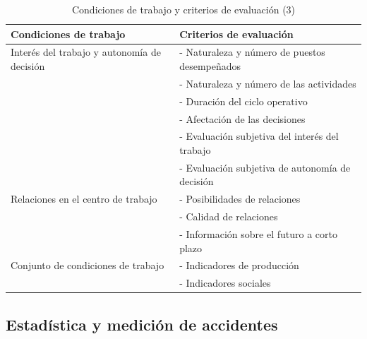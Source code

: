 \documentclass{article} %
\begin{document}
    \begin{table}[h!]
    \centering
    \begin{tabular}{|l|l|}
    \hline
    \textbf{Condiciones de trabajo}          & \textbf{Criterios de evaluación}                                  \\ \hline
    Interés del trabajo y autonomía de decisión & - Naturaleza y número de puestos desempeñados                     \\
                                             & - Naturaleza y número de las actividades                          \\
                                             & - Duración del ciclo operativo                                    \\
                                             & - Afectación de las decisiones                                    \\
                                             & - Evaluación subjetiva del interés del trabajo                    \\
                                             & - Evaluación subjetiva de autonomía de decisión                   \\ \hline
    Relaciones en el centro de trabajo       & - Posibilidades de relaciones                                     \\
                                             & - Calidad de relaciones                                           \\
                                             & - Información sobre el futuro a corto plazo                       \\ \hline
    Conjunto de condiciones de trabajo       & - Indicadores de producción                                       \\
                                             & - Indicadores sociales                                            \\ \hline
    \end{tabular}
    \caption{Condiciones de trabajo y criterios de evaluación (3)}
    \end{table}

\newpage    


\subsection{Estadística y medición de accidentes}
\end{document}
